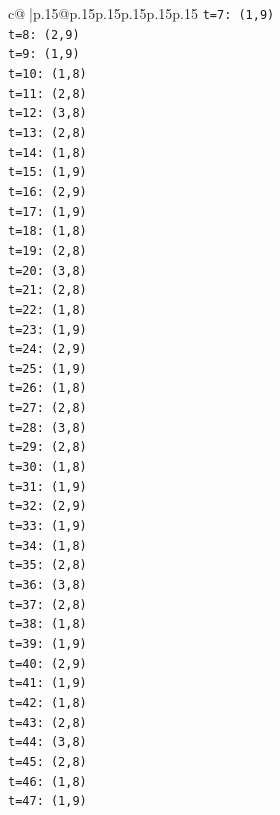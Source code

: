 \documentclass{article}
\begin{document}
{\begin{supertabular}{c@{$\;$}|p{.15\linewidth}@{}p{.15\linewidth}p{.15\linewidth}p{.15\linewidth}p{.15\linewidth}p{.15\linewidth}}
{{{\texttt{t=7: (1,9)} \\
\texttt{t=8: (2,9)} \\
\texttt{t=9: (1,9)} \\
\texttt{t=10: (1,8)} \\
\texttt{t=11: (2,8)} \\
\texttt{t=12: (3,8)} \\
\texttt{t=13: (2,8)} \\
\texttt{t=14: (1,8)} \\
\texttt{t=15: (1,9)} \\
\texttt{t=16: (2,9)} \\
\texttt{t=17: (1,9)} \\
\texttt{t=18: (1,8)} \\
\texttt{t=19: (2,8)} \\
\texttt{t=20: (3,8)} \\
\texttt{t=21: (2,8)} \\
\texttt{t=22: (1,8)} \\
\texttt{t=23: (1,9)} \\
\texttt{t=24: (2,9)} \\
\texttt{t=25: (1,9)} \\
\texttt{t=26: (1,8)} \\
\texttt{t=27: (2,8)} \\
\texttt{t=28: (3,8)} \\
\texttt{t=29: (2,8)} \\
\texttt{t=30: (1,8)} \\
\texttt{t=31: (1,9)} \\
\texttt{t=32: (2,9)} \\
\texttt{t=33: (1,9)} \\
\texttt{t=34: (1,8)} \\
\texttt{t=35: (2,8)} \\
\texttt{t=36: (3,8)} \\
\texttt{t=37: (2,8)} \\
\texttt{t=38: (1,8)} \\
\texttt{t=39: (1,9)} \\
\texttt{t=40: (2,9)} \\
\texttt{t=41: (1,9)} \\
\texttt{t=42: (1,8)} \\
\texttt{t=43: (2,8)} \\
\texttt{t=44: (3,8)} \\
\texttt{t=45: (2,8)} \\
\texttt{t=46: (1,8)} \\
\texttt{t=47: (1,9)} \\
}}}
\end{supertabular}}
\end{document}
